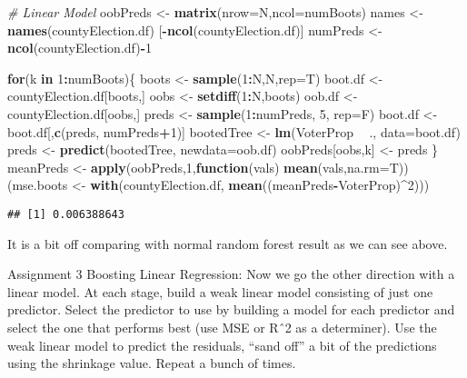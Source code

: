 \documentclass[]{article}
\newenvironment{Shaded}{\begin{snugshade}}{\end{snugshade}}
\newcommand{\CommentTok}[1]{\textcolor[rgb]{0.56,0.35,0.01}{\textit{#1}}}
\newcommand{\ControlFlowTok}[1]{\textcolor[rgb]{0.13,0.29,0.53}{\textbf{#1}}}
\newcommand{\DataTypeTok}[1]{\textcolor[rgb]{0.13,0.29,0.53}{#1}}
\newcommand{\DecValTok}[1]{\textcolor[rgb]{0.00,0.00,0.81}{#1}}
\newcommand{\KeywordTok}[1]{\textcolor[rgb]{0.13,0.29,0.53}{\textbf{#1}}}
\newcommand{\NormalTok}[1]{#1}
\newcommand{\OperatorTok}[1]{\textcolor[rgb]{0.81,0.36,0.00}{\textbf{#1}}}
\newcommand{\StringTok}[1]{\textcolor[rgb]{0.31,0.60,0.02}{#1}}
\begin{document}
\begin{Shaded}
\begin{Highlighting}[]
\CommentTok{# Linear Model}
\NormalTok{oobPreds <-}\StringTok{ }\KeywordTok{matrix}\NormalTok{(}\DataTypeTok{nrow=}\NormalTok{N,}\DataTypeTok{ncol=}\NormalTok{numBoots) }
\NormalTok{names <-}\StringTok{ }\KeywordTok{names}\NormalTok{(countyElection.df) [}\OperatorTok{-}\KeywordTok{ncol}\NormalTok{(countyElection.df)] }
\NormalTok{numPreds <-}\StringTok{ }\KeywordTok{ncol}\NormalTok{(countyElection.df)}\OperatorTok{-}\DecValTok{1}

\ControlFlowTok{for}\NormalTok{(k }\ControlFlowTok{in} \DecValTok{1}\OperatorTok{:}\NormalTok{numBoots)\{}
\NormalTok{  boots <-}\StringTok{ }\KeywordTok{sample}\NormalTok{(}\DecValTok{1}\OperatorTok{:}\NormalTok{N,N,}\DataTypeTok{rep=}\NormalTok{T)}
\NormalTok{  boot.df <-}\StringTok{ }\NormalTok{countyElection.df[boots,]}
\NormalTok{  oobs <-}\StringTok{ }\KeywordTok{setdiff}\NormalTok{(}\DecValTok{1}\OperatorTok{:}\NormalTok{N,boots)}
\NormalTok{  oob.df <-}\StringTok{ }\NormalTok{countyElection.df[oobs,]}
\NormalTok{  preds <-}\StringTok{ }\KeywordTok{sample}\NormalTok{(}\DecValTok{1}\OperatorTok{:}\NormalTok{numPreds, }\DecValTok{5}\NormalTok{, }\DataTypeTok{rep=}\NormalTok{F)}
\NormalTok{  boot.df <-}\StringTok{ }\NormalTok{boot.df[,}\KeywordTok{c}\NormalTok{(preds, numPreds}\OperatorTok{+}\DecValTok{1}\NormalTok{)] }
\NormalTok{  bootedTree <-}\StringTok{ }\KeywordTok{lm}\NormalTok{(VoterProp }\OperatorTok{~}\StringTok{ }\NormalTok{.,}
                   \DataTypeTok{data=}\NormalTok{boot.df)}
\NormalTok{  preds <-}\StringTok{ }\KeywordTok{predict}\NormalTok{(bootedTree, }\DataTypeTok{newdata=}\NormalTok{oob.df)}
\NormalTok{  oobPreds[oobs,k] <-}\StringTok{ }\NormalTok{preds }
\NormalTok{\}}
\NormalTok{meanPreds <-}\StringTok{ }\KeywordTok{apply}\NormalTok{(oobPreds,}\DecValTok{1}\NormalTok{,}\ControlFlowTok{function}\NormalTok{(vals) }\KeywordTok{mean}\NormalTok{(vals,}\DataTypeTok{na.rm=}\NormalTok{T))}
\NormalTok{(mse.boots <-}\StringTok{ }\KeywordTok{with}\NormalTok{(countyElection.df, }\KeywordTok{mean}\NormalTok{((meanPreds}\OperatorTok{-}\NormalTok{VoterProp)}\OperatorTok{^}\DecValTok{2}\NormalTok{)))}
\end{Highlighting}
\end{Shaded}

\begin{verbatim}
## [1] 0.006388643
\end{verbatim}

It is a bit off comparing with normal random forest result as we can see
above.

Assignment 3 Boosting Linear Regression: Now we go the other direction
with a linear model. At each stage, build a weak linear model consisting
of just one predictor. Select the predictor to use by building a model
for each predictor and select the one that performs best (use MSE or Rˆ2
as a determiner). Use the weak linear model to predict the residuals,
``sand off'' a bit of the predictions using the shrinkage value. Repeat
a bunch of times.
\end{document}
